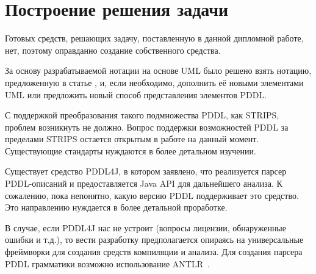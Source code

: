 \section{Построение решения задачи}
   
    Готовых средств, решающих задачу, поставленную в данной дипломной работе, нет, поэтому оправданно создание собственного средства.

    За основу разрабатываемой нотации на основе UML было решено взять нотацию, предложенную в статье \cite{mal-manz}, и, если необходимо, дополнить её новыми элементами UML или предложить новый способ представления элементов PDDL.

    С поддержкой преобразования такого подмножества PDDL, как STRIPS, проблем возникнуть не должно.
 Вопрос поддержки возможностей PDDL за пределами STRIPS остается открытым в работе на данный момент.
 Существующие стандарты нуждаются в более детальном изучении.

    Существует средство PDDL4J, в котором заявлено, что реализуется парсер PDDL-описаний и предоставляется Java API для дальнейшего анализа.
 К сожалению, пока непонятно, какую версию PDDL поддерживает это средство.
 Это направлению нуждается в более детальной проработке.
     
    В случае, если PDDL4J нас не устроит (вопросы лицензии, обнаруженные ошибки и т.д.), то вести разработку предполагается опираясь на универсальные фреймворки для создания средств компиляции и анализа.
 Для создания парсера PDDL грамматики возможно использование ANTLR~\cite{antlr}.
 
 \newpage